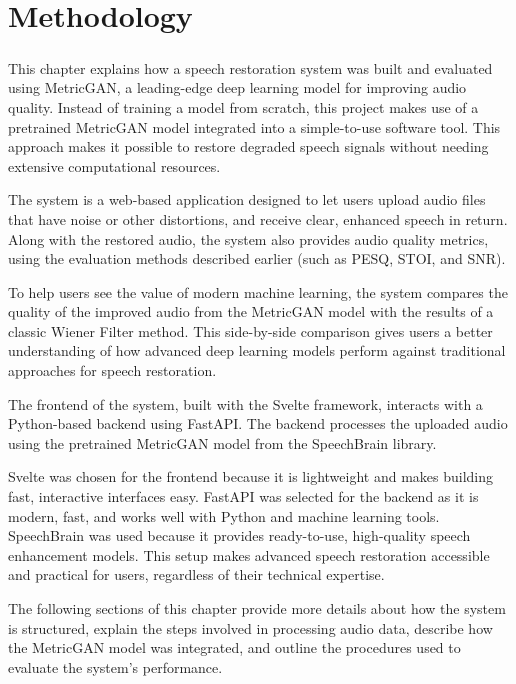 \chapter{Methodology}
\paragraph{}

This chapter explains how a speech restoration system was built and evaluated using MetricGAN, a leading-edge deep learning model for improving audio quality. Instead of training a model from scratch, this project makes use of a pretrained MetricGAN model integrated into a simple-to-use software tool. This approach makes it possible to restore degraded speech signals without needing extensive computational resources.

The system is a web-based application designed to let users upload audio files that have noise or other distortions, and receive clear, enhanced speech in return. Along with the restored audio, the system also provides audio quality metrics, using the evaluation methods described earlier (such as PESQ, STOI, and SNR).

To help users see the value of modern machine learning, the system compares the quality of the improved audio from the MetricGAN model with the results of a classic Wiener Filter method. This side-by-side comparison gives users a better understanding of how advanced deep learning models perform against traditional approaches for speech restoration.

The frontend of the system, built with the Svelte framework, interacts with a Python-based backend using FastAPI. The backend processes the uploaded audio using the pretrained MetricGAN model from the SpeechBrain library. 

Svelte was chosen for the frontend because it is lightweight and makes building fast, interactive interfaces easy. FastAPI was selected for the backend as it is modern, fast, and works well with Python and machine learning tools. SpeechBrain was used because it provides ready-to-use, high-quality speech enhancement models. This setup makes advanced speech restoration accessible and practical for users, regardless of their technical expertise.

The following sections of this chapter provide more details about how the system is structured, explain the steps involved in processing audio data, describe how the MetricGAN model was integrated, and outline the procedures used to evaluate the system’s performance.

